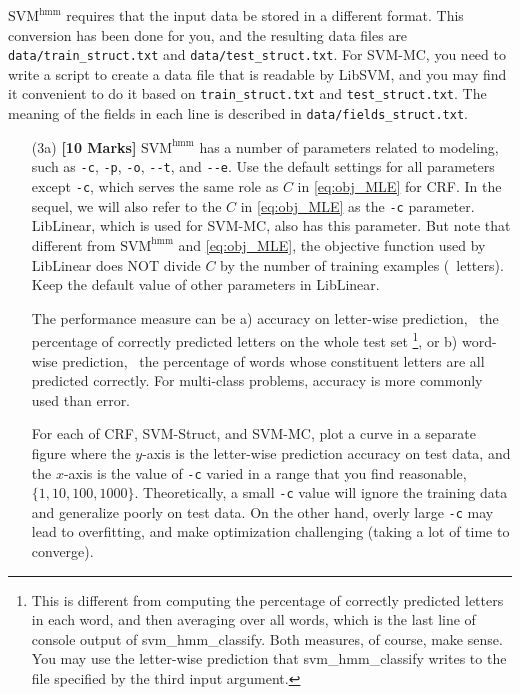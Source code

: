 \documentclass[11pt]{report}
\begin{document}
	
	$\text{SVM}^{\text{hmm}}$ requires that the input data be stored in a different format.
	This conversion has been done for you, and the resulting data files are \verb#data/train_struct.txt# and \verb#data/test_struct.txt#.
	For SVM-MC, you need to write a script to create a data file that is readable by LibSVM,
	and you may find it convenient to do it based on \verb#train_struct.txt# and \verb#test_struct.txt#.
	The meaning of the fields in each line is described in \verb#data/fields_struct.txt#.
	
	
	
	
	\begin{itemize}
		\item[(3a)] {\bf [10 Marks]} $\text{SVM}^{\text{hmm}}$ has a number of parameters related to modeling, such as \verb#-c#, \verb#-p#, \verb#-o#, \verb#--t#, and \verb#--e#.
		Use the default settings for all parameters except \verb#-c#,
		which serves the same role as $C$ in \eqref{eq:obj_MLE} for CRF.
		In the sequel, we will also refer to the $C$ in \eqref{eq:obj_MLE} as the \verb#-c# parameter.
		LibLinear, which is used for SVM-MC, also has this parameter.
		But note that different from $\text{SVM}^{\text{hmm}}$ and \eqref{eq:obj_MLE}, the objective function used by LibLinear does NOT divide $C$ by the number of training examples (\ie\ letters).
		Keep the default value of other parameters in LibLinear.
		
		The performance measure can be a) accuracy on letter-wise prediction, \ie\ the percentage of correctly predicted letters on the whole test set%
		\footnote{This is different from computing the percentage of correctly predicted letters in each word, and then averaging over all words, which is the last line of console output of \textsf{svm\_hmm\_classify}.  Both measures, of course, make sense.
			You may use the letter-wise prediction that \textsf{svm\_hmm\_classify} writes to the file specified by the third input argument.},
		or b) word-wise prediction, \ie\ the percentage of words whose constituent letters are all predicted correctly.
		For multi-class problems, accuracy is more commonly used than error.
		
		For each of CRF, SVM-Struct, and SVM-MC,
		plot a curve in a separate figure where the $y$-axis is the letter-wise prediction accuracy on test data,
		and the $x$-axis is the value of \verb#-c# varied in a range that you find reasonable,
		\eg\ $\{1, 10, 100, 1000\}$.
		Theoretically, a small \verb#-c# value will ignore the training data and generalize poorly on test data.
		On the other hand, overly large \verb#-c# may lead to overfitting, and make optimization challenging (taking a lot of time to converge).
		

\end{itemize}
\end{document}
